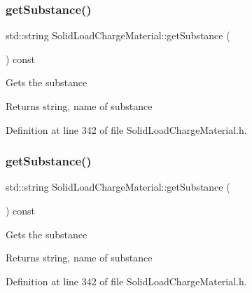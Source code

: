\subsubsection{\texorpdfstring{get\+Substance()}{getSubstance()}\hspace{0.1cm}{\footnotesize\ttfamily [1/3]}}
{\footnotesize\ttfamily std\+::string Solid\+Load\+Charge\+Material\+::get\+Substance (\begin{DoxyParamCaption}{ }\end{DoxyParamCaption}) const\hspace{0.3cm}{\ttfamily [inline]}}

Gets the substance \begin{DoxyReturn}{Returns}
string, name of substance 
\end{DoxyReturn}


Definition at line 342 of file Solid\+Load\+Charge\+Material.\+h.

\mbox{\label{class_solid_load_charge_material_ade525be6bb8cb86405daeb61d45311f9}} 
\subsubsection{\texorpdfstring{get\+Substance()}{getSubstance()}\hspace{0.1cm}{\footnotesize\ttfamily [2/3]}}
{\footnotesize\ttfamily std\+::string Solid\+Load\+Charge\+Material\+::get\+Substance (\begin{DoxyParamCaption}{ }\end{DoxyParamCaption}) const\hspace{0.3cm}{\ttfamily [inline]}}

Gets the substance \begin{DoxyReturn}{Returns}
string, name of substance 
\end{DoxyReturn}


Definition at line 342 of file Solid\+Load\+Charge\+Material.\+h.

\mbox{\label{class_solid_load_charge_material_ade525be6bb8cb86405daeb61d45311f9}} 
